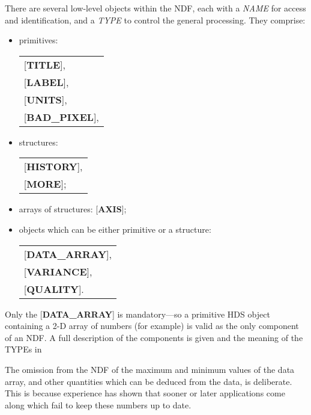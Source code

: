 There are several low-level objects within the NDF, each with a {\it
NAME} for access and identification, and a {\it TYPE} to control the
general processing.  They comprise:
\begin{itemize}
\item primitives: \begin{minipage}[t]{3in}
                  \begin{tabular}{l}
                  {[}{\bf TITLE}{]}, \\
                  {[}{\bf LABEL}{]}, \\
                  {[}{\bf UNITS}{]}, \\
                  {[}{\bf BAD\_PIXEL}{]}, \\
                  \end{tabular}\end{minipage}
\item structures: \begin{minipage}[t]{2in}
                  \begin{tabular}{l}
                  {[}{\bf HISTORY}{]}, \\
                  {[}{\bf MORE}{]}; \\
                  \end{tabular}\end{minipage}
\item arrays of structures: {[}{\bf AXIS}{]};
\item objects which can be either primitive or a structure: \begin{minipage}[t]{2in}
                  \begin{tabular}{l}
                  {[}{\bf DATA\_ARRAY}{]}, \\
                  {[}{\bf VARIANCE}{]}, \\
                  {[}{\bf QUALITY}{]}. \\
                  \end{tabular}\end{minipage}
\end{itemize}
Only the {[}{\bf DATA\_ARRAY}{]} is
mandatory---so a primitive HDS object containing
a 2-D array of numbers (for example) is
valid as the only component of an NDF.
A full description of the components is given
and the meaning of the TYPEs in

The omission from the NDF of the maximum and minimum
values of the data array, and other quantities which can be
deduced from the data, is deliberate.  This is
because experience has shown that sooner or later
applications come along which fail to keep these
numbers up to date.

